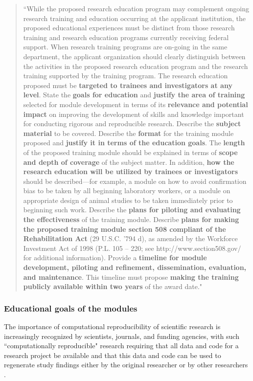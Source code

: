 \documentclass[pdftex,english,11pt,parskip=half]{scrartcl}
\begin{document}
\begin{quotation}
``While the proposed research education program may complement ongoing research training and education occurring at the applicant institution, the proposed educational experiences must be distinct from those research training and research education programs currently receiving federal support. When research training programs are on-going in the same department, the applicant organization should clearly distinguish between the activities in the proposed research education program and the research training supported by the training program. The research education proposed must be \textbf{targeted to trainees and investigators at any level}. State the \textbf{goals for education} and \textbf{justify the area of training} selected for module development in terms of its \textbf{relevance and potential impact} on improving the development of skills and knowledge important for conducting rigorous and reproducible research. Describe the \textbf{subject material} to be covered.  Describe the \textbf{format} for the training module proposed and \textbf{justify it in terms of the education goals}.  The \textbf{length} of the proposed training module should be explained in terms of \textbf{scope and depth of coverage} of the subject matter.  In addition, \textbf{how the research education will be utilized by trainees or investigators} should be described---for example, a module on how to avoid confirmation bias to be taken by all beginning laboratory workers, or a module on appropriate design of animal studies to be taken immediately prior to beginning such work.  Describe the \textbf{plans for piloting and evaluating the effectiveness} of the training module. Describe \textbf{plans for making the proposed training module section 508 compliant of the Rehabilitation Act} (29 U.S.C. '794 d), as amended by the Workforce Investment Act of 1998 (P.L. 105 – 220; see http://www.section508.gov/ for additional information). Provide a \textbf{timeline for module development, piloting and refinement, dissemination, evaluation, and maintenance}.  This timeline must propose \textbf{making the training publicly available within two years} of the award date."
\end{quotation}

\subsubsection{Educational goals of the modules}

The importance of computational reproducibility of scientific research is increasingly recognized by scientists, journals, and funding agencies, with such ``computationally reproducible" research requiring that all data and code for a research project be available and that this data and code can be used to regenerate study findings either by the original researcher or by other researchers \cite{ellis2017share, ram2013git}.
\end{document}
